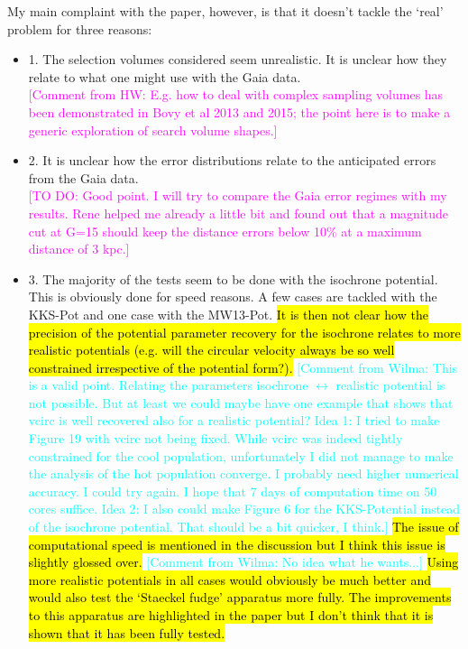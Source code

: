 \documentclass[10pt,a4paper]{article}
\newcommand{\Wilma}[1]{\textcolor{Magenta}{#1}}
\newcommand{\HW}[1]{\textcolor{Cyan}{#1}}
\begin{document}
My main complaint with the paper, however, is that it doesn't tackle the `real'
problem for three reasons:
\begin{itemize}
\item 1. The selection volumes considered seem unrealistic. It is unclear how they relate to what one might use with the Gaia data.\\
\Wilma{[Comment from HW: E.g. how to deal with complex sampling volumes has been demonstrated in Bovy et al 2013 and 2015; the point here is to make a generic exploration of search volume shapes.]}
\item 2. It is unclear how the error distributions relate to the anticipated errors from the Gaia data. \\
\Wilma{[TO DO: Good point. I will try to compare the Gaia error regimes with my results. Rene helped me already a little bit and found out that a magnitude cut at G=15 should keep the distance errors below 10\% at a maximum distance of 3 kpc.]}
\item 3. The majority of the tests seem to be done with the isochrone potential. This is obviously done for speed reasons. A few cases are tackled with the KKS-Pot and one
case with the MW13-Pot. \hl{It is then not clear how the precision of the potential
parameter recovery for the isochrone relates to more realistic potentials (e.g.
will the circular velocity always be so well constrained irrespective of the
potential form?).}
\HW{[Comment from Wilma: This is a valid point. Relating the parameters isochrone $\leftrightarrow$ realistic potential is not possible. But at least we could maybe have one example that shows that vcirc is well recovered also for a realistic potential? Idea 1: I tried to make Figure 19 with vcirc not being fixed. While vcirc was indeed tightly constrained for the cool population, unfortunately I did not manage to make the analysis of the hot population converge. I probably need higher numerical accuracy. I could try again. I hope that 7 days of computation time on 50 cores suffice. Idea 2: I also could make Figure 6 for the KKS-Potential instead of the isochrone potential. That should be a bit quicker, I think.]}
\hl{The issue of computational speed is mentioned in the discussion
but I think this issue is slightly glossed over.}
\HW{[Comment from Wilma: No idea what he wants...]}
\hl{Using more realistic potentials in all cases would obviously be much better and would also test the `Staeckel fudge'
apparatus more fully. The improvements to this apparatus are highlighted in the paper but I don't think that it is shown that it has been fully tested.} 

\end{itemize}
\end{document}
